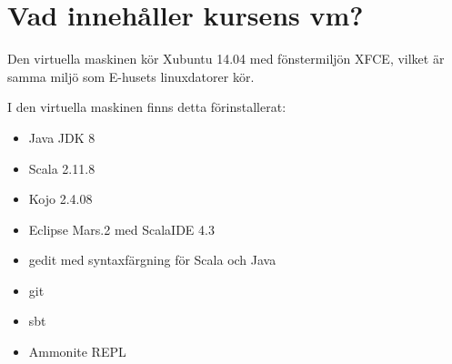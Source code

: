\section{Vad innehåller kursens vm?}

Den virtuella maskinen kör Xubuntu 14.04 med fönstermiljön XFCE, vilket är samma miljö som E-husets linuxdatorer kör. 

I den virtuella maskinen finns detta förinstallerat:

\begin{itemize}
\item Java JDK 8
\item Scala 2.11.8
\item Kojo 2.4.08
\item Eclipse Mars.2 med ScalaIDE 4.3
\item gedit med syntaxfärgning för Scala och Java
\item git
\item sbt
\item Ammonite REPL
\end{itemize}